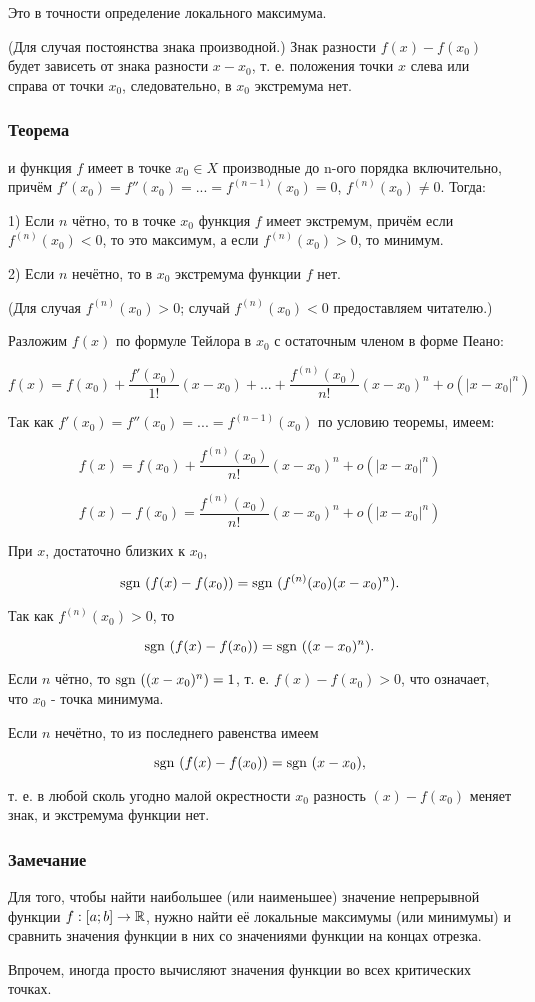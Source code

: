 Это в точности определение локального максимума.

\dokvo (Для случая постоянства знака производной.)
Знак разности $f(x)-f(x_0)$ будет зависеть от знака разности $x-x_0$, т. е. положения точки $x$ слева или справа от точки $x_0$, следовательно, в $x_0$ экстремума нет.

\dokno

\subsubsection{Теорема}
\fXR и функция $f$ имеет в точке $x_0\in X$ производные до n-ого порядка включительно, причём $f'(x_0)=f''(x_0)=...=f^{(n-1)}(x_0)=0$, $f^{(n)}(x_0) \neq 0$.
Тогда:

1) Если $n$ чётно, то в точке $x_0$ функция $f$ имеет экстремум, причём если $f^{(n)}(x_0)<0$, то это максимум, а если $f^{(n)}(x_0)>0$, то минимум.

2) Если $n$ нечётно, то в $x_0$ экстремума функции $f$ нет.

\dokvo (Для случая $f^{(n)}(x_0)>0$; случай $f^{(n)}(x_0)<0$ предоставляем читателю.)

Разложим $f(x)$ по формуле Тейлора в $x_0$ с остаточным членом в форме Пеано:

$$
f(x)=f(x_0)+\frac{f'(x_0)}{1!}(x-x_0)+...+\frac{f^{(n)}(x_0)}{n!}(x-x_0)^n+o(|x-x_0|^n)
$$

Так как $f'(x_0)=f''(x_0)=...=f^{(n-1)}(x_0)$ по условию теоремы, имеем:

$$
f(x)=f(x_0)+\frac{f^{(n)}(x_0)}{n!}(x-x_0)^n+o(|x-x_0|^n)
$$


$$
f(x)-f(x_0)=\frac{f^{(n)}(x_0)}{n!}(x-x_0)^n+o(|x-x_0|^n)
$$

При $x$, достаточно близких к $x_0$,

$$
\mathrm{sgn}~(f(x)-f(x_0))=\mathrm{sgn}~(f^{(n)}(x_0)(x-x_0)^n).
$$

Так как $f^{(n)}(x_0)>0$, то

$$
\mathrm{sgn}~(f(x)-f(x_0))=\mathrm{sgn}~((x-x_0)^n).
$$

Если $n$ чётно, то $\mathrm{sgn}~((x-x_0)^n)=1$, т. е. $f(x)-f(x_0)>0$, что означает, что $x_0$ - точка минимума.

Если $n$ нечётно, то из последнего равенства имеем

$$
\mathrm{sgn}~(f(x)-f(x_0))=\mathrm{sgn}~(x-x_0),
$$

т. е. в любой сколь угодно малой окрестности $x_0$ разность $(x)-f(x_0)$ меняет знак, и экстремума функции нет.

\subsubsection{Замечание}

Для того, чтобы найти наибольшее (или наименьшее) значение непрерывной функции $f:[a;b] \to \mathbb{R}$, нужно найти её локальные максимумы (или минимумы) и сравнить значения функции в них со значениями функции на концах отрезка.

Впрочем, иногда просто вычисляют значения функции во всех критических точках.
